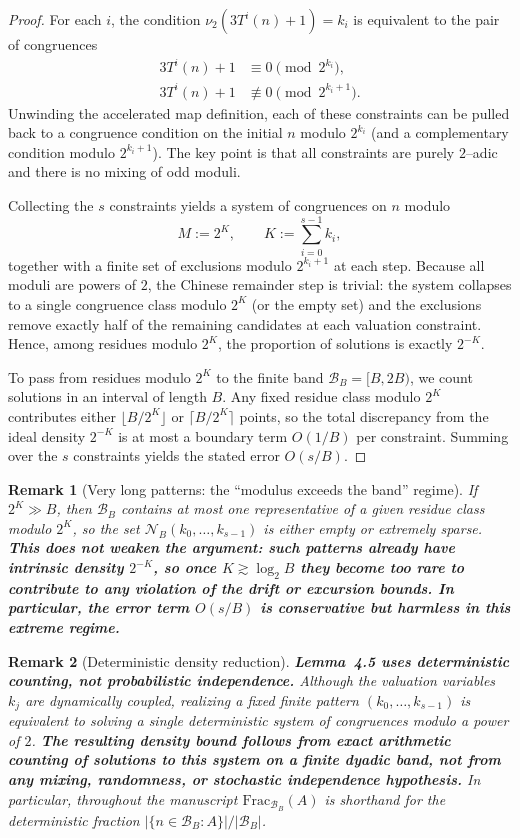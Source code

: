 \documentclass[preprint,12pt]{elsarticle}
\newtheorem{remark}{Remark}
\newcommand{\BandFrac}[2]{\mathrm{Frac}_{#1}\!\left(#2\right)} %
\begin{document}
\begin{proof}
For each $i$, the condition $\nu_2(3T^i(n)+1)=k_i$ is equivalent to the pair of
congruences
\[
\begin{aligned}
3T^i(n)+1 &\equiv 0 \pmod{2^{k_i}},\\
3T^i(n)+1 &\not\equiv 0 \pmod{2^{k_i+1}}.
\end{aligned}
\]
Unwinding the accelerated map definition,
each of these constraints can be pulled back to a congruence condition on the
initial $n$ modulo $2^{k_i}$ (and a complementary condition modulo
$2^{k_i+1}$). The key point is that all constraints are purely $2$--adic and
there is no mixing of odd moduli.

Collecting the $s$ constraints yields a system of congruences on $n$ modulo
\[
M:=2^{K},\qquad K:=\sum_{i=0}^{s-1}k_i,
\]
together with a finite set of exclusions modulo $2^{k_i+1}$ at each step.
Because all moduli are powers of $2$, the Chinese remainder step is trivial:
the system collapses to a single congruence class modulo $2^K$ (or the empty
set) and the exclusions remove exactly half of the remaining candidates at
each valuation constraint. Hence, among residues modulo $2^K$, the proportion
of solutions is exactly $2^{-K}$.

To pass from residues modulo $2^K$ to the finite band $\mathcal{B}_B=[B,2B)$,
we count solutions in an interval of length $B$. Any fixed residue class
modulo $2^K$ contributes either $\lfloor B/2^K\rfloor$ or
$\lceil B/2^K\rceil$ points, so the total discrepancy from the ideal density
$2^{-K}$ is at most a boundary term $O(1/B)$ per constraint. Summing over the
$s$ constraints yields the stated error $O(s/B)$.
\end{proof}

\begin{remark}[Very long patterns: the ``modulus exceeds the band'' regime]
If $2^{K}\gg B$, then $\mathcal{B}_B$ contains at most one representative of a
given residue class modulo $2^K$, so the set
$\mathcal{N}_B(k_0,\dots,k_{s-1})$ is either empty or extremely sparse.
\textbf{This does not weaken the argument: such patterns already have intrinsic density
$2^{-K}$, so once $K\gtrsim \log_2 B$ they become too rare to contribute to any
violation of the drift or excursion bounds. In particular, the error term
$O(s/B)$ is conservative but harmless in this extreme regime.}
\end{remark}

\begin{remark}[Deterministic density reduction]
\label{rem:density-deterministic}
\textbf{Lemma~4.5 uses deterministic counting, not probabilistic independence.}
Although the valuation variables $k_j$ are dynamically coupled,
realizing a fixed finite pattern $(k_0,\dots,k_{s-1})$ is equivalent to
solving a single deterministic system of congruences modulo a power of
$2$.
\textbf{The resulting density bound follows from exact arithmetic counting of
solutions to this system on a finite dyadic band, not from any mixing,
randomness, or stochastic independence hypothesis.}
In particular, throughout the manuscript $\BandFrac{\mathcal{B}_B}{A}$ is shorthand for the deterministic fraction $|\{n\in\mathcal{B}_B: A\}|/|\mathcal{B}_B|$.
\end{remark}
\end{document}
